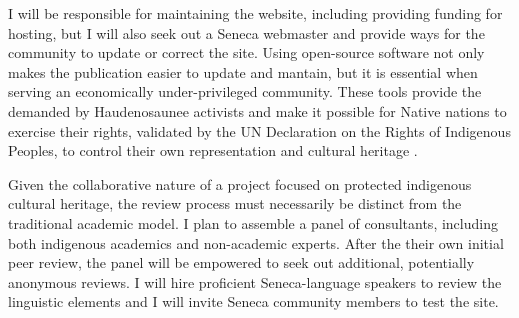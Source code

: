 \documentclass{neh}
\begin{document}
I will be responsible for maintaining the website, including providing 
funding for hosting, but I will also seek out a Seneca webmaster and provide
ways for the community to update or correct the site. 
Using open-source software not only makes the publication easier to update and
mantain, but it is essential when serving an economically
under-privileged community.
These tools provide the  demanded by
Haudenosaunee activists and make it possible for Native nations to exercise
their rights, validated by the UN Declaration on the Rights of Indigenous
Peoples, to control their own representation and cultural heritage
\autocite{BasicCall}.

Given the collaborative nature of a project focused on protected indigenous
cultural heritage, the review process must necessarily be distinct from the
traditional academic model.
I plan to assemble a panel of consultants, including both indigenous academics
and non-academic experts.
After the their own initial peer review, the panel will be empowered to seek
out additional, potentially anonymous reviews.
I will hire proficient Seneca-language speakers to review the linguistic
elements and I will invite Seneca community members to test the site.
\end{document}

